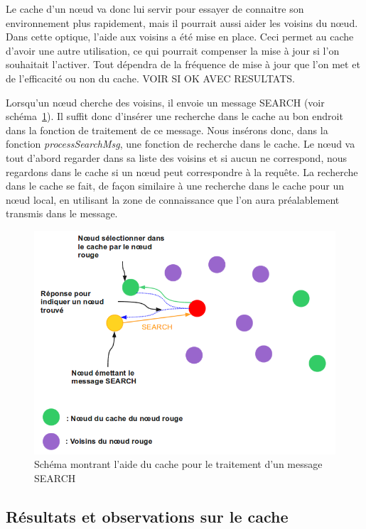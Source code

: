 Le cache d'un nœud va donc lui servir pour essayer de connaitre son environnement plus rapidement, mais il pourrait aussi aider les voisins du nœud. Dans cette optique, l'aide aux voisins a été mise en place. Ceci permet au cache d'avoir une autre utilisation, ce qui pourrait compenser la mise à jour si l'on souhaitait l'activer. Tout dépendra de la fréquence de mise à jour que l'on met et de l'efficacité ou non du cache. VOIR SI OK AVEC RESULTATS.
\par Lorsqu'un nœud cherche des voisins, il envoie un message SEARCH (voir schéma~\ref{schemaHelpCache}). Il suffit donc d'insérer une recherche dans le cache au bon endroit dans la fonction de traitement de ce message. Nous insérons donc, dans la fonction \textit{processSearchMsg}, une fonction de recherche dans le cache. Le nœud va tout d'abord regarder dans sa liste des voisins et si aucun ne correspond, nous regardons dans le cache si un nœud peut correspondre à la requête. La recherche dans le cache se fait, de façon similaire à une recherche dans le cache pour un nœud local, en utilisant la zone de connaissance que l'on aura préalablement transmis dans le message.

	\begin{figure}[!h]
        \centering
        \includegraphics[scale=0.4]{./Ressources/Images/cacheHelp.png}
        \caption{Schéma montrant l'aide du cache pour le traitement d'un message SEARCH}
        \label{schemaHelpCache}
        \end{figure}

\subsection{Résultats et observations sur le cache}
\label{resObsCache}

